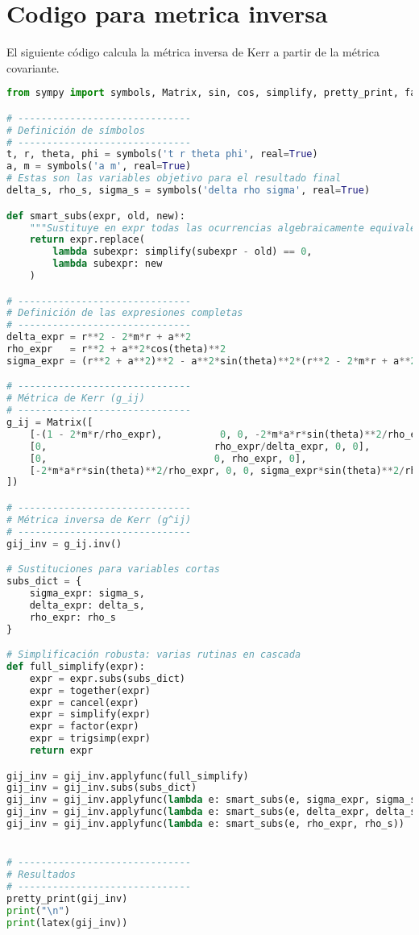 \section{Codigo para metrica inversa}
\label{sec:codigo_metrica_inversa}
El siguiente código calcula la métrica inversa de Kerr a partir de la métrica covariante.
\begin{lstlisting}[language=Python, caption=Programa para el calculo de la métrica inversa de Kerr]
    from sympy import symbols, Matrix, sin, cos, simplify, pretty_print, factor, cancel, together, trigsimp, latex

# ------------------------------
# Definición de símbolos
# ------------------------------
t, r, theta, phi = symbols('t r theta phi', real=True)
a, m = symbols('a m', real=True)
# Estas son las variables objetivo para el resultado final
delta_s, rho_s, sigma_s = symbols('delta rho sigma', real=True)

def smart_subs(expr, old, new):
    """Sustituye en expr todas las ocurrencias algebraicamente equivalentes a old por new."""
    return expr.replace(
        lambda subexpr: simplify(subexpr - old) == 0,
        lambda subexpr: new
    )

# ------------------------------
# Definición de las expresiones completas
# ------------------------------
delta_expr = r**2 - 2*m*r + a**2
rho_expr   = r**2 + a**2*cos(theta)**2
sigma_expr = (r**2 + a**2)**2 - a**2*sin(theta)**2*(r**2 - 2*m*r + a**2)

# ------------------------------
# Métrica de Kerr (g_ij)
# ------------------------------
g_ij = Matrix([
    [-(1 - 2*m*r/rho_expr),          0, 0, -2*m*a*r*sin(theta)**2/rho_expr],
    [0,                             rho_expr/delta_expr, 0, 0],
    [0,                             0, rho_expr, 0],
    [-2*m*a*r*sin(theta)**2/rho_expr, 0, 0, sigma_expr*sin(theta)**2/rho_expr]
])

# ------------------------------
# Métrica inversa de Kerr (g^ij)
# ------------------------------
gij_inv = g_ij.inv()

# Sustituciones para variables cortas
subs_dict = {
    sigma_expr: sigma_s,
    delta_expr: delta_s,
    rho_expr: rho_s
}

# Simplificación robusta: varias rutinas en cascada
def full_simplify(expr):
    expr = expr.subs(subs_dict)
    expr = together(expr)
    expr = cancel(expr)
    expr = simplify(expr)
    expr = factor(expr)
    expr = trigsimp(expr)
    return expr

gij_inv = gij_inv.applyfunc(full_simplify)
gij_inv = gij_inv.subs(subs_dict)
gij_inv = gij_inv.applyfunc(lambda e: smart_subs(e, sigma_expr, sigma_s))
gij_inv = gij_inv.applyfunc(lambda e: smart_subs(e, delta_expr, delta_s))
gij_inv = gij_inv.applyfunc(lambda e: smart_subs(e, rho_expr, rho_s))


# ------------------------------
# Resultados
# ------------------------------
pretty_print(gij_inv)
print("\n")
print(latex(gij_inv))
\end{lstlisting}



